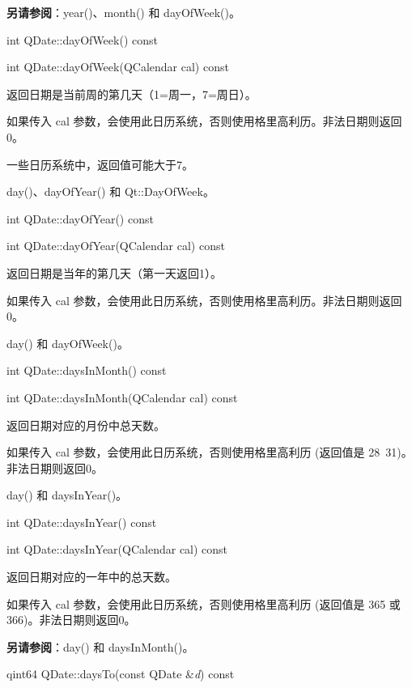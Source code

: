 \textbf{另请参阅}：year()、month() 和 dayOfWeek()。

\splitLine

int QDate::dayOfWeek() const

int QDate::dayOfWeek(QCalendar cal) const

返回日期是当前周的第几天（1=周一，7=周日）。

如果传入 cal 参数，会使用此日历系统，否则使用格里高利历。非法日期则返回0。

一些日历系统中，返回值可能大于7。

\begin{notice}[另请参阅]
day()、dayOfYear() 和 Qt::DayOfWeek。
\end{notice}

\splitLine

int QDate::dayOfYear() const

int QDate::dayOfYear(QCalendar cal) const

返回日期是当年的第几天（第一天返回1）。

如果传入 cal 参数，会使用此日历系统，否则使用格里高利历。非法日期则返回0。

\begin{notice}[另请参阅]
day() 和 dayOfWeek()。
\end{notice}

\splitLine

int QDate::daysInMonth() const

int QDate::daysInMonth(QCalendar cal) const

返回日期对应的月份中总天数。

如果传入 cal 参数，会使用此日历系统，否则使用格里高利历 (返回值是 28~31)。非法日期则返回0。



\begin{notice}[另请参阅]
day() 和 daysInYear()。
\end{notice}

\splitLine

int QDate::daysInYear() const

int QDate::daysInYear(QCalendar cal) const

返回日期对应的一年中的总天数。

如果传入 cal 参数，会使用此日历系统，否则使用格里高利历 (返回值是 365 或 366)。非法日期则返回0。

\textbf{另请参阅}：day() 和 daysInMonth()。

\splitLine

qint64 QDate::daysTo(const QDate \&\emph{d}) const

